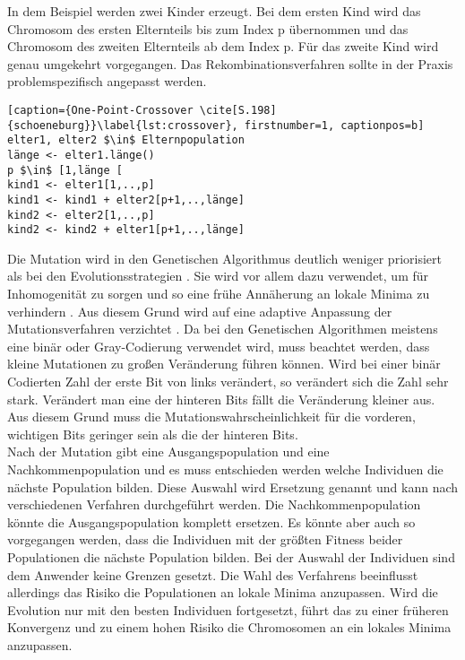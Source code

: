 In dem Beispiel werden zwei Kinder erzeugt. Bei dem ersten Kind wird das Chromosom des ersten Elternteils bis zum Index p übernommen und das Chromosom des zweiten Elternteils ab dem Index p. Für das zweite Kind wird genau umgekehrt vorgegangen. Das Rekombinationsverfahren sollte in der Praxis problemspezifisch angepasst werden.
\begin{lstlisting}[caption={One-Point-Crossover \cite[S.198]{schoeneburg}}\label{lst:crossover}, firstnumber=1, captionpos=b]
elter1, elter2 $\in$ Elternpopulation
länge <- elter1.länge()
p $\in$ [1,länge [
kind1 <- elter1[1,..,p]
kind1 <- kind1 + elter2[p+1,..,länge]
kind2 <- elter2[1,..,p]
kind2 <- kind2 + elter1[p+1,..,länge]
\end{lstlisting}
Die Mutation wird in den Genetischen Algorithmus deutlich weniger priorisiert als bei den Evolutionsstrategien \cite[S. 200]{schoeneburg}. Sie wird vor allem dazu verwendet, um für Inhomogenität zu sorgen und so eine frühe Annäherung an lokale Minima zu verhindern \cite[S. 200]{schoeneburg}.
Aus diesem Grund wird auf eine adaptive Anpassung der Mutationsverfahren verzichtet \cite[S. 200]{schoeneburg}. Da bei den Genetischen Algorithmen meistens eine binär oder Gray-Codierung verwendet wird, muss beachtet werden, dass kleine Mutationen zu großen Veränderung führen können.
Wird bei einer binär Codierten Zahl der erste Bit von links verändert, so verändert sich die Zahl sehr stark. Verändert man eine der hinteren Bits fällt die Veränderung kleiner aus. Aus diesem Grund muss die Mutationswahrscheinlichkeit für die vorderen, wichtigen Bits geringer sein als die der hinteren Bits.\\
Nach der Mutation gibt eine Ausgangspopulation und eine Nachkommenpopulation und es muss entschieden werden welche Individuen die nächste Population bilden. Diese Auswahl wird Ersetzung genannt und kann nach verschiedenen Verfahren durchgeführt werden.
Die Nachkommenpopulation könnte die Ausgangspopulation komplett ersetzen. Es könnte aber auch so vorgegangen werden, dass die Individuen mit der größten Fitness beider Populationen die nächste Population bilden. Bei der Auswahl der Individuen sind dem Anwender keine Grenzen gesetzt. Die Wahl des Verfahrens beeinflusst allerdings das Risiko die Populationen an lokale Minima anzupassen. Wird die Evolution nur mit den besten Individuen fortgesetzt, führt das zu einer früheren Konvergenz und zu einem hohen Risiko die Chromosomen an ein lokales Minima anzupassen. 

